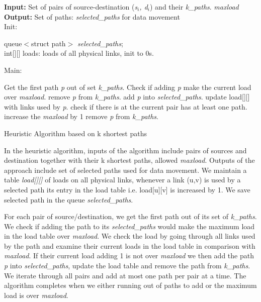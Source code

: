 \begin{algorithm}[!htbp]
\textbf{Input:} Set of pairs of source-destination (\textit{s$_i$, d$_i$}) and their \textit{k\_paths}. \textit{maxload}\\
\textbf{Output:} Set of paths: \textit{selected\_paths} for data movement\\
Init:
    \begin{algorithmic}
        \State queue$<$struct path$>$ \textit{selected\_paths};\\
	int[][] loads: loads of all physical links, init to 0s.\\
    \end{algorithmic}
Main:
\begin{algorithmic}
	    \State Get the first path \textit{p} out of set \textit{k\_paths}.
	    \State Check if adding \textit{p} make the current load over \textit{maxload}.
		\State remove \textit{p} from \textit{k\_paths}.
		\State add \textit{p} into \textit{selected\_paths}.
		\State update load[][] with links used by \textit{p}.
	    \Else 
		\State check if there is at the current pair has at least one path.
		    \State increase the \textit{maxload} by 1
		\Else
		    \State remove \textit{p} from \textit{k\_paths}.
		\EndIf
	    \EndIf
	\EndFor
	\EndWhile
    \EndFunction
\end{algorithmic}

\caption{Heuristic Algorithm based on k shortest paths}
\label{alg:heu}

\end{algorithm}

In the heuristic algorithm, inputs of the algorithm include pairs of sources and destination together with their k shortest paths, allowed \textit{maxload}. Outputs of the approach include set of selected paths used for data movement. We maintain a table \textit{load[][]} of loads on all physical links, whenever a link (u,v) is used by a selected path its entry in the load table i.e. load[u][v] is increased by 1. We save selected path in the queue \textit{selected\_paths}.

For each pair of source/destination, we get the first path out of its set of \textit{k\_paths}. We check if adding the path to its \textit{selected\_paths} would make the maximum load in the load table over \textit{maxload}. We check the load by going through all links used by the path and examine their current loads in the load table in comparison with \textit{maxload}. If their current load adding 1 is not over \textit{maxload} we then add the path \textit{p} into \textit{selected\_paths}, update the load table and remove the path from \textit{k\_paths}. We iterate through all pairs and add at most one path per pair at a time. The algorithm completes when we either running out of paths to add or the maximum load is over \textit{maxload}.


